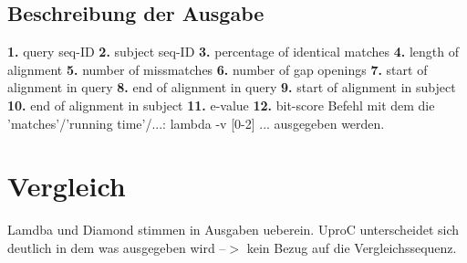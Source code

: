 \documentclass[11pt, a4paper]{scrartcl}
\begin{document}
\begin{flushleft}
\subsection{Beschreibung der Ausgabe}
\begin{flushleft}
\textbf{1.} query seq-ID\linebreak
\textbf{2.} subject seq-ID\linebreak
\textbf{3.} percentage of identical matches\linebreak
\textbf{4.} length of alignment\linebreak
\textbf{5.} number of missmatches\linebreak
\textbf{6.} number of gap openings\linebreak
\textbf{7.} start of alignment in query\linebreak
\textbf{8.} end of alignment in query\linebreak
\textbf{9.} start of alignment in subject\linebreak
\textbf{10.} end of alignment in subject\linebreak
\textbf{11.} e-value\linebreak
\textbf{12.} bit-score\linebreak
\linebreak
Befehl mit dem die 'matches'/'running time'/...:
\color{red}lambda -v [0-2] ... \color{black} ausgegeben werden.
\end{flushleft}

\section{Vergleich}

Lamdba und Diamond stimmen in Ausgaben ueberein. UproC unterscheidet sich deutlich in dem was ausgegeben wird --$>$ kein Bezug auf die Vergleichssequenz.

\end{flushleft}
\end{document}
